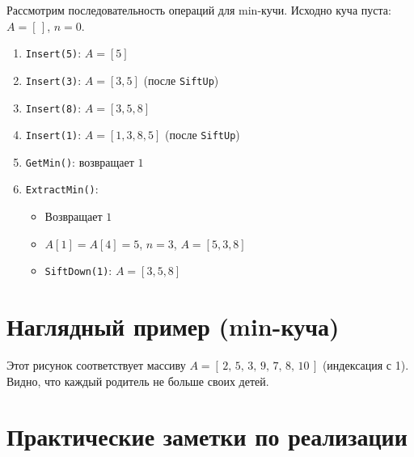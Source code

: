 \documentclass[12pt,a4paper]{article}
\begin{document}
Рассмотрим последовательность операций для min-кучи. Исходно куча пуста: $A = [\,]$, $n=0$.

\begin{enumerate}
  \item \texttt{Insert(5)}: $A = [5]$
  \item \texttt{Insert(3)}: $A = [3, 5]$ (после \texttt{SiftUp})
  \item \texttt{Insert(8)}: $A = [3, 5, 8]$
  \item \texttt{Insert(1)}: $A = [1, 3, 8, 5]$ (после \texttt{SiftUp})
  \item \texttt{GetMin()}: возвращает $1$
  \item \texttt{ExtractMin()}: 
    \begin{itemize}
      \item Возвращает $1$
      \item $A[1] = A[4] = 5$, $n=3$, $A = [5, 3, 8]$
      \item \texttt{SiftDown(1)}: $A = [3, 5, 8]$
    \end{itemize}
\end{enumerate}

\section{Наглядный пример (min-куча)}

\begin{center}
\end{center}

Этот рисунок соответствует массиву $A = [\,2,\,5,\,3,\,9,\,7,\,8,\,10\,]$ (индексация с 1). Видно, что каждый родитель не больше своих детей.

\section{Практические заметки по реализации}
\end{document}
